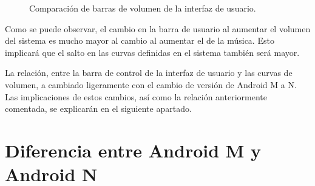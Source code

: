 \begin{figure}[H]
	\centering
	\break
	\caption{Comparación de barras de volumen de la interfaz de usuario.} \label{fig:volume_compare_ui}
\end{figure}

Como se puede observar, el cambio en la barra de usuario al aumentar el volumen del sistema es mucho mayor al cambio al aumentar el de la música. Esto implicará que el salto en las curvas definidas en el sistema también será mayor.

La relación, entre la barra de control de la interfaz de usuario y las curvas de volumen, a cambiado ligeramente con el cambio de versión de Android M a N. Las implicaciones de estos cambios, así como la relación anteriormente comentada, se explicarán en el siguiente apartado.

\section{Diferencia entre Android M y Android N}
